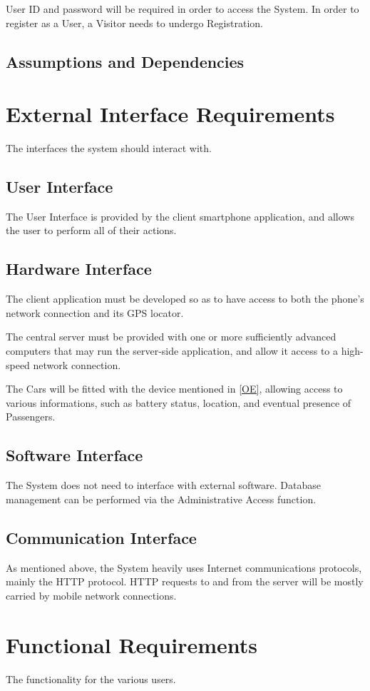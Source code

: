 User ID and password will be required in order to access the System. In order to register as a User, a Visitor needs to undergo Registration. 

\subsection{Assumptions and Dependencies}


\clearpage\section{External Interface Requirements}
The interfaces the system should interact with.
\subsection{User Interface}
The User Interface is provided by the client smartphone application, and allows the user to perform all of their actions.
\subsection{Hardware Interface}
The client application must be developed so as to have access to both the phone's network connection and its GPS locator.

The central server must be provided with one or more sufficiently advanced computers that may run the server-side application, and allow it access to a high-speed network connection.

The Cars will be fitted with the device mentioned in \ref{OE}, allowing access to various informations, such as battery status, location, and eventual presence of Passengers.
\subsection{Software Interface}
The System does not need to interface with external software. Database management can be performed via the Administrative Access function.
\subsection{Communication Interface}
As mentioned above, the System heavily uses Internet communications protocols, mainly the HTTP protocol. HTTP requests to and from the server will be mostly carried by mobile network connections.

\clearpage\section{Functional Requirements}
The functionality for the various users.
